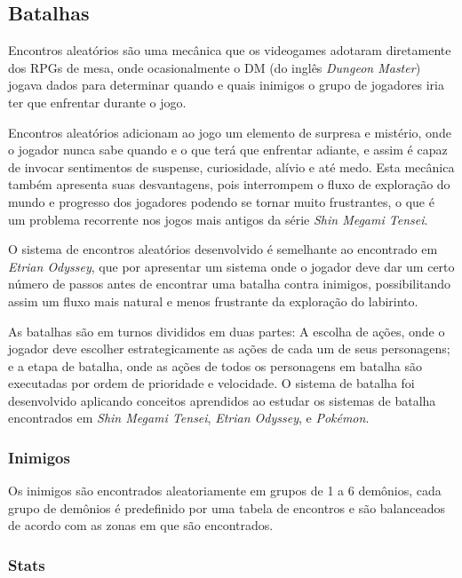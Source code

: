\documentclass[
	12pt,				%
	openright,			%
	twoside,			%
	a4paper,			%
	english,			%
	french,				%
	spanish,			%
	brazil				%
	]{abntex2}
\begin{document}
\subsection{Batalhas}

Encontros aleatórios são uma mecânica que os videogames adotaram diretamente dos RPGs de mesa, onde ocasionalmente o DM (do inglês \emph{Dungeon Master}) jogava dados para determinar quando e quais inimigos o grupo de jogadores iria ter que enfrentar durante o jogo.

	Encontros aleatórios adicionam ao jogo um elemento de surpresa e mistério, onde o jogador nunca sabe quando e o que terá que enfrentar adiante, e assim é capaz de invocar sentimentos de suspense, curiosidade, alívio e até medo. Esta mecânica também apresenta suas desvantagens, pois interrompem o fluxo de exploração do mundo e progresso dos jogadores podendo se tornar muito frustrantes, o que é um problema recorrente nos jogos mais antigos da série \emph{Shin Megami Tensei}. 

	O sistema de encontros aleatórios desenvolvido é semelhante ao encontrado em \emph{Etrian Odyssey}, que por apresentar um sistema onde o jogador deve dar um certo número de passos antes de encontrar uma batalha contra inimigos, possibilitando assim um fluxo mais natural e menos frustrante da exploração do labirinto. 

	As batalhas são em turnos divididos em duas partes: A escolha de ações, onde o jogador deve escolher estrategicamente as ações de cada um de seus personagens; e a etapa de batalha, onde as ações de todos os personagens em batalha são executadas por ordem de prioridade e velocidade. O sistema de batalha foi desenvolvido aplicando conceitos aprendidos ao estudar os sistemas de batalha encontrados em \emph{Shin Megami Tensei}, \emph{Etrian Odyssey}, e \emph{Pokémon}.

\subsubsection{Inimigos}

Os inimigos são encontrados aleatoriamente em grupos de 1 a 6 demônios, cada grupo de demônios é predefinido por uma tabela de encontros e são balanceados de acordo com as zonas em que são encontrados.

\subsubsection{Stats}\label{info:stats}
\end{document}
